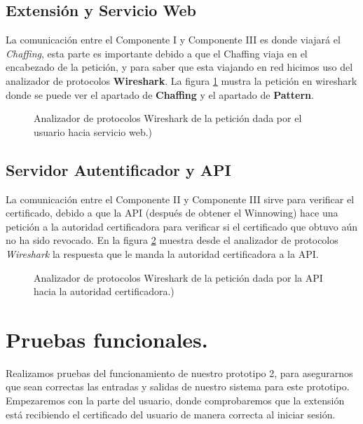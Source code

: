 \documentclass[12pt, a4paper, titlepage]{report}
\begin{document}
	        \subsection{Extensión y Servicio Web}
	        
	            La comunicación entre el Componente I y Componente III es donde viajará el \textit{Chaffing}, esta parte es importante debido a que el Chaffing viaja en el encabezado de la petición, y para saber que esta viajando en red hicimos uso del analizador de protocolos \textbf{Wireshark}. La figura \ref{fig:Wireshark_C1_C3} mustra la petición en wireshark donde se puede ver el apartado de \textbf{Chaffing} y el apartado de \textbf{Pattern}.
	        
    	        \begin{figure}[H]
        	        \centering 
        	        
        	        \caption{Analizador de protocolos Wireshark de la petición dada por el usuario hacia servicio web.)}    	 \label{fig:Wireshark_C1_C3}
    	        \end{figure}
	        
	        \subsection{Servidor Autentificador y API}
	        
    	        La comunicación entre el Componente II y Componente III sirve para verificar el certificado, debido a que la API (después de obtener el Winnowing) hace una petición a la autoridad certificadora para verificar si el certificado que obtuvo aún no ha sido revocado. En la figura \ref{fig:Wireshark_C2_C3} muestra desde el analizador de protocolos \textit{Wireshark} la respuesta que le manda la autoridad certificadora a la API.
    	        
    	        \begin{figure}[H]
        	        \centering 
        	        
        	        \caption{Analizador de protocolos Wireshark de la petición dada por la API hacia la autoridad certificadora.)}    	 
        	        \label{fig:Wireshark_C2_C3}
    	        \end{figure}
	        
	    
	    \section{Pruebas funcionales.}
    	    Realizamos pruebas del funcionamiento de nuestro prototipo 2, para asegurarnos que sean correctas las entradas y salidas de nuestro sistema para este prototipo. Empezaremos con la parte del usuario, donde comprobaremos que la extensión está recibiendo el certificado del usuario de manera correcta al iniciar sesión. 
	    
\end{document}
